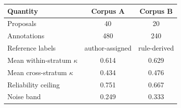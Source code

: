 \begin{tabular}{lcc}
\toprule
Quantity & Corpus A & Corpus B \\
\midrule
Proposals & 40 & 20 \\
Annotations & 480 & 240 \\
Reference labels & author-assigned & rule-derived \\
Mean within-stratum $\kappa$ & 0.614 & 0.629 \\
Mean cross-stratum $\kappa$ & 0.434 & 0.476 \\
Reliability ceiling & 0.751 & 0.667 \\
Noise band & 0.249 & 0.333 \\
\bottomrule
\end{tabular}